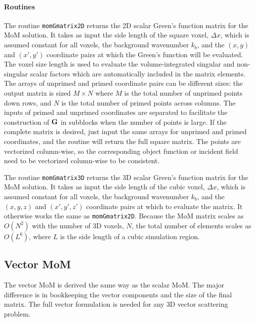 \paragraph{Routines} The routine \texttt{momGmatrix2D} returns the 2D scalar Green's function matrix for the MoM solution. It takes as input the side length of the square voxel, $\Delta x$, which is assumed constant for all voxels, the background wavenumber $k_b$, and the $(x,y)$ and $(x',y')$ coordinate pairs at which the Green's function will be evaluated. The voxel size length is used to evaluate the volume-integrated singular and non-singular scalar factors which are automatically included in the matrix elements. The arrays of unprimed and primed coordinate pairs can be different sizes: the output matrix is sized $M \times N$ where $M$ is the total number of unprimed points down rows, and $N$ is the total number of primed points across columns. The inputs of primed and unprimed coordinates are separated to facilitate the construction of $\mathbf{G}$ in subblocks when the number of points is large. If the complete matrix is desired, just input the same arrays for unprimed and primed coordinates, and the routine will return the full square matrix. The points are vectorized column-wise, so the corresponding object function or incident field need to be vectorized column-wise to be consistent. 


{\scriptsize
{}
}

\clearpage
The routine \texttt{momGmatrix3D} returns the 3D scalar Green's function matrix for the MoM solution. It takes as input the side length of the cubic voxel, $\Delta x$, which is assumed constant for all voxels, the background wavenumber $k_b$, and the $(x,y,z)$ and $(x',y',z')$ coordinate pairs at which to evaluate the matrix. It otherwise works the same as \texttt{momGmatrix2D}. Because the MoM matrix scales as $O(N^2)$ with the number of 3D voxels, $N$, the total number of elements scales as $O(L^6)$, where $L$ is the side length of a cubic simulation region.



{\footnotesize
{}
}



\subsection{Vector MoM}

The vector MoM is derived the same way as the scalar MoM. The major difference is in bookkeeping the vector components and the size of the final matrix. The full vector formulation is needed for any 3D vector scattering problem.  

